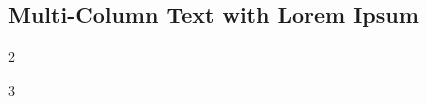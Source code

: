 \subsection{Multi-Column Text with Lorem Ipsum}
\begin{multicols}{2}
    \lipsum[1-4]
\end{multicols}

\begin{multicols}{3}
    \lipsum[1-4]
\end{multicols}